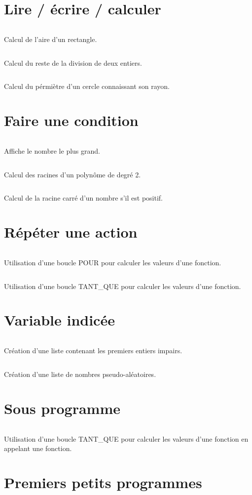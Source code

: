 \documentclass{article}
\newcommand{\codeAlgobox}[3]{%
    \renewcommand\listingscaption{Algorithme}
    \begin{listing}[H]
        \inputminted[linenos, 
                     stepnumber = 1,
                     bgcolor = black!5,
                     fontsize = \footnotesize,
                     samepage]{algobox}{#1}%
        \caption{#2}
        \label{lst:#3}
    \end{listing}
}%
\begin{document}
\section{Lire / écrire / calculer}

\codeAlgobox{algo_txt/aire_rectangle.algo}{Calcul de l'aire d'un rectangle.}{aire_rec}
\codeAlgobox{algo_txt/reste.algo}{Calcul du reste de la division de deux entiers.}{reste}
\codeAlgobox{algo_txt/perimetre.algo}{Calcul du pérmiètre d'un cercle connaissant son
rayon.}{perimetre}

\section{Faire une condition}

\codeAlgobox{algo_txt/le_plus_grand.algo}{Affiche le nombre le plus grand.}{le_plus_grand}
\codeAlgobox{algo_txt/discriminent.algo}{Calcul des racines d'un polynôme de degré
2.}{discriminent}
\codeAlgobox{algo_txt/racine_x.algo}{Calcul de la racine carré d'un nombre s'il est
positif.}{racine}

\section{Répéter une action}

\codeAlgobox{algo_txt/calc_val_fonction_1.algo}{Utilisation d'une boucle POUR pour
calculer les valeurs d'une fonction.}{valfonction1}
\codeAlgobox{algo_txt/calc_val_fonction_2.algo}{Utilisation d'une boucle TANT\_QUE pour
calculer les valeurs d'une fonction.}{valfonction2}

\section{Variable indicée}

\codeAlgobox{algo_txt/liste_impair.algo}{Création d'une liste contenant les premiers
entiers impairs.}{impairs}
\codeAlgobox{algo_txt/liste_random.algo}{Création d'une liste de nombres
pseudo-aléatoires.}{random}

\section{Sous programme}

\codeAlgobox{algo_txt/calc_val_fonction_3.algo}{Utilisation d'une boucle TANT\_QUE pour
calculer les valeurs d'une fonction en appelant une fonction.}{valfonction3}

\section{Premiers petits programmes}
\end{document}
